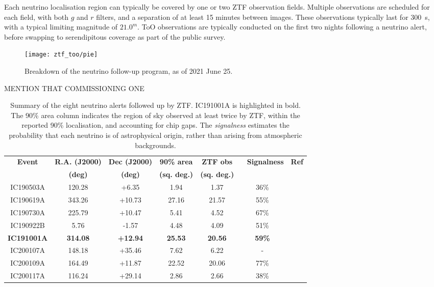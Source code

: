  Each neutrino localisation region can typically be covered by one or two ZTF observation fields. Multiple observations are scheduled for each field, with both $g$ and $r$ filters, and a separation of at least 15 minutes between images. These observations typically last for 300~s, with a typical limiting magnitude of $21.0^{m}$.  ToO observations are typically conducted on the first two nights following a neutrino alert, before swapping to serendipitous coverage as part of the public survey. 
 
 \begin{figure}[!ht]
 	\centering \texttt{[image: ztf\_too/pie]}
 	\caption{Breakdown of the neutrino follow-up program, as of 2021 June 25. }
 	\label{fig:pie}
 \end{figure}
 
 MENTION THAT COMMISSIONING ONE
 
 \begin{table*}
 	\centering
 	\begin{tabular}{||c c c c c c c ||} 
 		\hline
 		\textbf{Event} & \textbf{R.A. (J2000)} & \textbf{Dec (J2000)} & \textbf{90\% area} & \textbf{ZTF obs} &~ \textbf{Signalness}& \textbf{Ref}\\
 		& \textbf{(deg)}&\textbf{(deg)}& \textbf{(sq. deg.)}& \textbf{(sq. deg.)} &&\\
 		\hline
 		IC190503A & 120.28 & +6.35 & 1.94& 1.37 & 36\%&\cite{ic190503a, ic190503a_ztf}\\
 		IC190619A & 343.26 & +10.73 & 27.16& 21.57 & 55\%&\cite{ic190619a, ic190619a_ztf}\\
 		IC190730A & 225.79 & +10.47 & 5.41& 4.52 & 67\%&\cite{ic190730a,ic190730a_ztf}\\
 		IC190922B & 5.76 & -1.57 & 4.48 & 4.09 & 51\%&\cite{ic190922b, ic190922b_atel, ic190922b_ztf}\\
 		\textbf{IC191001A} & \textbf{314.08} & \textbf{+12.94} & \textbf{25.53} & \textbf{20.56} & \textbf{59\%}& \textbf{\cite{ic191001a,ic191001a_atel, ic191001a_ztf}}\\
 		IC200107A & 148.18 & +35.46 & 7.62 & 6.22 & - &\cite{ic200107a,ic200107a_ztf}\\
 		IC200109A & 164.49 & +11.87 & 22.52 & 20.06 & 77\%&\cite{ic200109a,ic200109a_ztf}\\
 		IC200117A & 116.24 & +29.14 & 2.86 &  2.66 & 38\%&\cite{ic200117a,ic200117a_ztf, ic200117a_ztf_2}\\
 		\hline
 	\end{tabular}
 	\caption{Summary of the eight neutrino alerts followed up by ZTF. IC191001A is highlighted in bold. The 90\% area column indicates the region of sky observed at least twice by ZTF, within the reported 90\% localisation, and accounting for chip gaps. The \textit{signalness} estimates the probability that each neutrino is of astrophysical origin, rather than arising from atmospheric backgrounds.}
 	\label{tab:nu_alerts_old}
 \end{table*}

